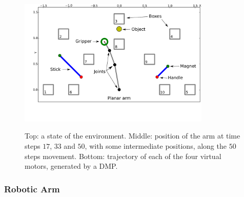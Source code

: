 \documentclass[10pt,letterpaper]{article}
\begin{document}
		\begin{figure}[h]
			\centering
			\hspace{-0.73cm}
			\vspace{-1.31cm}
			\includegraphics[width=9.12cm]{./include/tools.pdf}
			\\
			\hspace{-0.42cm}
			\caption{Top: a state of the environment. Middle: position of the arm at time steps $17$, $33$ and $50$,  with some intermediate positions, along the $50$ steps movement. Bottom: trajectory of each of the four virtual motors, generated by a DMP.}
			\label{env}
		\end{figure}

		\subsubsection{Robotic Arm}
		
\end{document}
